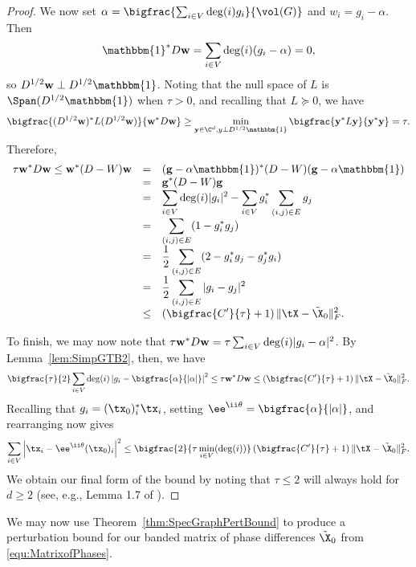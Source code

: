 \begin{proof}
We now set $\alpha = \bigfrac{\sum_{i \in V} \deg(i) g_i}{\vol(G)}$ and $w_i = g_i - \alpha$.  Then \[\mathbbm{1}^* D {\bf w} = \sum_{i \in V} \deg(i)(g_i - \alpha) = 0,\] so $D^{1/2}{\bf w} \perp D^{1/2}\mathbbm{1}$.  Noting that the null space of $L$ is $\Span(D^{1/2}\mathbbm{1})$ when $\tau > 0$, and recalling that $L \succeq 0$, we have
\[\bigfrac{(D^{1/2}{\bf w})^* L (D^{1/2} {\bf w})}{{\bf w}^* D {\bf w}} \ge \min_{{\bf y} \in \C^d, y \perp D^{1/2}\mathbbm{1}} \bigfrac{{\bf y}^* L {\bf y}}{{\bf y}^* {\bf y}} = \tau.\]  
Therefore, \[\everymath{\displaystyle} \begin{array}{rcl}%
\tau {\bf w}^* D {\bf w} \le {\bf w}^*(D - W) {\bf w} & = & ({\bf g} - \alpha\mathbbm{1})^*(D - W)( {\bf g} - \alpha\mathbbm{1}) \\%
 & = & {\bf g}^*(D - W) {\bf g} \\%
 & = & \sum_{i \in V} \deg(i) |g_i|^2 - \sum_{i \in V} g_i^* \sum_{(i,j) \in E}  g_j \\%
 & = & \sum_{(i,j) \in E} (1 - g_i^* g_j) \\%
 & = & \frac{1}{2} \sum_{(i ,j) \in E} (2 - g_i^* g_j - g_j^* g_i) \\%
 & = & \frac{1}{2} \sum_{(i, j) \in E} |g_i - g_j|^2 \\%
 & \le & \left(\bigfrac{C'}{\tau} + 1\right) \|\tX - \tilde{\X}_0\|_F^2.%
\end{array}\]%

To finish, we may now note that $\tau {\bf w}^* D {\bf w} = \tau \sum_{i \in V}\deg(i)|g_i - \alpha|^2$.  By Lemma~\ref{lem:SimpGTB2}, then, we have 
\[\bigfrac{\tau}{2} \sum_{i \in V} \deg(i) \left| g_i - \bigfrac{\alpha}{|\alpha|} \right|^2 \le \tau {\bf w}^* D {\bf w} \le \left(\bigfrac{C'}{\tau} + 1\right) \|\tX - \tilde{\X}_0\|_F^2.\]  
Recalling that $g_i = (\tx_0)_i^* \tx_i$, setting $\ee^{\ii\theta} = \bigfrac{\alpha}{|\alpha|}$, and rearranging now gives 
\[\sum_{i \in V} \left | \tx_i - \ee^{\ii \theta}(\tx_0)_i \right|^2 \le \bigfrac{2}{\tau \min_{i \in V}(\deg(i))} \left(\bigfrac{C'}{\tau} + 1\right)  \|\tX - \tilde{\X}_0\|_F^2.\]  
We obtain our final form of the bound by noting that $\tau \leq 2$ will always hold for $d \geq 2$ (see, e.g., Lemma 1.7 of \cite{chungspectral}).
\end{proof}

We may now use Theorem~\ref{thm:SpecGraphPertBound} to produce a perturbation bound for our banded matrix of phase differences $\tilde{\X}_0$ from \eqref{equ:MatrixofPhases}.

